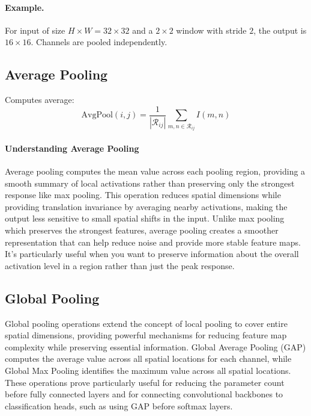 \paragraph{Example.} For input of size $H\times W=32\times32$ and a $2\times2$ window with stride $2$, the output is $16\times16$. Channels are pooled independently.

\subsection{Average Pooling}

Computes average:
\begin{equation}
\text{AvgPool}(i,j) = \frac{1}{|\mathcal{R}_{ij}|} \sum_{m,n \in \mathcal{R}_{ij}} I(m,n)
\end{equation}

\paragraph{Understanding Average Pooling}
Average pooling computes the mean value across each pooling region, providing a smooth summary of local activations rather than preserving only the strongest response like max pooling. This operation reduces spatial dimensions while providing translation invariance by averaging nearby activations, making the output less sensitive to small spatial shifts in the input. Unlike max pooling which preserves the strongest features, average pooling creates a smoother representation that can help reduce noise and provide more stable feature maps. It's particularly useful when you want to preserve information about the overall activation level in a region rather than just the peak response.

\subsection{Global Pooling}

Global pooling operations extend the concept of local pooling to cover entire spatial dimensions, providing powerful mechanisms for reducing feature map complexity while preserving essential information. Global Average Pooling (GAP) computes the average value across all spatial locations for each channel, while Global Max Pooling identifies the maximum value across all spatial locations. These operations prove particularly useful for reducing the parameter count before fully connected layers and for connecting convolutional backbones to classification heads, such as using GAP before softmax layers.


